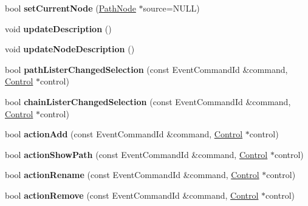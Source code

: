 \begin{DoxyCompactItemize}
\item 
bool {\bfseries set\+Current\+Node} (\hyperlink{classPathNode}{Path\+Node} $\ast$source=N\+U\+LL)\hypertarget{classNavComputer_abc51ec41f805fb0db0b30399f9f04b7e}{}\label{classNavComputer_abc51ec41f805fb0db0b30399f9f04b7e}

\item 
void {\bfseries update\+Description} ()\hypertarget{classNavComputer_abe1cf9d4d1f9ba7aca323bf917ba5d23}{}\label{classNavComputer_abe1cf9d4d1f9ba7aca323bf917ba5d23}

\item 
void {\bfseries update\+Node\+Description} ()\hypertarget{classNavComputer_a07232db5c05a1692573c048a753eebda}{}\label{classNavComputer_a07232db5c05a1692573c048a753eebda}

\item 
bool {\bfseries path\+Lister\+Changed\+Selection} (const Event\+Command\+Id \&command, \hyperlink{classControl}{Control} $\ast$control)\hypertarget{classNavComputer_aebb435de8162d2a4fe36f3ca90445260}{}\label{classNavComputer_aebb435de8162d2a4fe36f3ca90445260}

\item 
bool {\bfseries chain\+Lister\+Changed\+Selection} (const Event\+Command\+Id \&command, \hyperlink{classControl}{Control} $\ast$control)\hypertarget{classNavComputer_a02cbc01531c98e9140cea9d86efba3fb}{}\label{classNavComputer_a02cbc01531c98e9140cea9d86efba3fb}

\item 
bool {\bfseries action\+Add} (const Event\+Command\+Id \&command, \hyperlink{classControl}{Control} $\ast$control)\hypertarget{classNavComputer_a20aad8b24a8197cbf114a85753b49284}{}\label{classNavComputer_a20aad8b24a8197cbf114a85753b49284}

\item 
bool {\bfseries action\+Show\+Path} (const Event\+Command\+Id \&command, \hyperlink{classControl}{Control} $\ast$control)\hypertarget{classNavComputer_aff6a514813a72256ffcaf495abf97b02}{}\label{classNavComputer_aff6a514813a72256ffcaf495abf97b02}

\item 
bool {\bfseries action\+Rename} (const Event\+Command\+Id \&command, \hyperlink{classControl}{Control} $\ast$control)\hypertarget{classNavComputer_afd3bea40f076540ccee66bc337c2f312}{}\label{classNavComputer_afd3bea40f076540ccee66bc337c2f312}

\item 
bool {\bfseries action\+Remove} (const Event\+Command\+Id \&command, \hyperlink{classControl}{Control} $\ast$control)\hypertarget{classNavComputer_a3387be309adc8cd7479168bf5cee7ec0}{}\label{classNavComputer_a3387be309adc8cd7479168bf5cee7ec0}


\end{DoxyCompactItemize}
